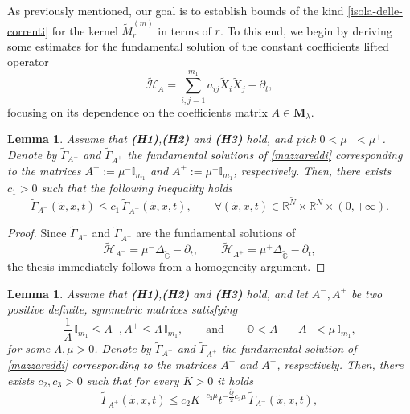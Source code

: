 \documentclass[11pt,a4paper]{article}
\newtheorem{lemma}[theorem]{\bf Lemma}
\numberwithin{equation}{section}
\def \rn {{\mathbb {R}}^{N}}
\def \rnm {{\mathbb {R}}^{\tilde N}}
\def \tt {\tilde}
\def \GG {{\mathbb{G}}}
\def \p {\partial}
\def \G {{\Gamma}}
\def \l {{\lambda}}
\def \m {{\mu}}
\begin{document}
{{As previously mentioned, our goal is to establish bounds of the kind \eqref{isola-delle-correnti} for the kernel $\tt M_r^{(m)}$ in terms of $r$. To this end, we begin by deriving some estimates for the fundamental solution of the constant coefficients lifted operator
\begin{equation}\label{mazzareddi}
	\tt{\mathscr{H}}_A=\sum_{i,j=1}^{m_1}a_{ij}\tt X_i\tt X_j-\p_t,
\end{equation} 
focusing on its dependence on the coefficients matrix $A \in \textbf{M}_\l$.
\begin{lemma}\label{sipuofaredipiu}
	Assume that \textbf{(H1)},\textbf{(H2)} and \textbf{(H3)} hold, and pick $0<\mu^-< \m^+$. Denote by $\tt\G_{A^{-}}$ and $\tt\G_{A^{+}}$ the fundamental solutions of \eqref{mazzareddi} corresponding to the matrices $A^{-}:=\mu^- \mathbb{I}_{m_1}$ and $A^{+}:=\mu^+ \mathbb{I}_{m_1}$, respectively. Then, there exists $c_1>0$ such that the following inequality holds
	\begin{equation}\label{-minore+}
		\tt\G_{A^{-}}(\tt x, x,t) \leq c_1\, \tt\G_{A^{+}} (\tilde x,x,t),\qquad \forall(\tilde x,x,t) \in \rnm\times \rn \times (0,+\infty).
	\end{equation} 
\end{lemma}
\begin{proof}
	Since $\tt\G_{A^{-}}$ and $\tt\G_{A^{+}}$ are the fundamental solutions of 
	\begin{equation}
		\tt{\mathscr{H}}_{A^-}=\m^-\Delta_{\tt\GG}-\p_t,\qquad \tt{\mathscr{H}}_{A^+}=\m^+\Delta_{\tt\GG}-\p_t,
	\end{equation} 
	the thesis immediately follows from a homogeneity argument.
\end{proof}
\begin{lemma}\label{menominorepiu}
	Assume that \textbf{(H1)},\textbf{(H2)} and \textbf{(H3)} hold, and let $A^-,A^+$ be two positive definite, symmetric matrices satisfying 
	\begin{equation}\label{ellip-Lambda-pachino}
		\frac{1}{\Lambda}\,\mathbb{I}_{m_1}\leq A^-,A^+\leq \Lambda\,\mathbb{I}_{m_1},\qquad \text{and} \qquad \mathbb{O}<A^+-A^-<\mu \, \mathbb{I}_{m_1},
	\end{equation}
	for some $\Lambda,\m>0$. Denote by $\tt\G_{A^{-}}$ and $\tt\G_{A^{+}}$ the fundamental solution of \eqref{mazzareddi} corresponding to the matrices $A^{-}$ and $A^{+}$, respectively. Then, there exists $c_2,c_3>0$ such that for every $K>0$ it holds
	\begin{equation}\label{+minore-}
		\tt\G_{A^{+}}(\tilde x,x,t) \leq c_2 K^{-c_3\mu} t^{-\frac{\tt Q}{2} c_3 \mu}\, \tt\G_{A^{-}} (\tilde x,x,t),

\end{equation}
\end{lemma}}}
\end{document}

